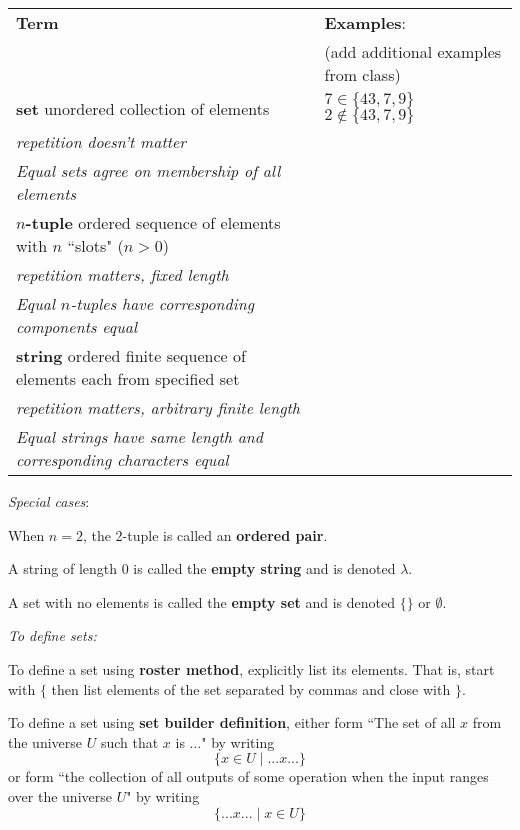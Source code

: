 \documentclass[12pt, oneside]{article}
\begin{document}
\begin{center}
    \begin{tabular}{p{4.6in}p{2.6in}}
    {\bf  Term} & {\bf Examples}:\\
    &  (add additional examples from class)\\
    \hline 
    {\bf set} \newline
    unordered collection of elements & $7 \in \{43, 7, 9 \}$ \qquad $2 \notin \{43, 7, 9 \}$ \\
    {\it repetition doesn't matter} & \\
    {\it Equal sets agree on membership of all elements}& \\
    \hline
    {\bf $n$-tuple} \newline
    ordered sequence of elements with $n$ ``slots" ($n >0$) & \\
    {\it repetition matters, fixed length} &\\
    {\it Equal $n$-tuples have corresponding components equal}& \\
    \hline
    {\bf string} \newline
    ordered finite sequence of elements each from specified
    set & \\
    {\it repetition matters, arbitrary finite length} &\\
    {\it Equal strings have same length and corresponding characters equal}
    \end{tabular}
\end{center}

{\it Special cases}: 

When $n=2$, the 2-tuple is called an {\bf ordered pair}.

A string of length $0$ is called the {\bf empty string} and is denoted $\lambda$.

A set with no elements is called the {\bf empty set} and is denoted $\{\}$ or $\emptyset$. 

{\it To define sets:}

To define a set using {\bf roster method}, explicitly list its elements. That is,
start with $\{$ then list elements of 
the set separated by commas and close with $\}$.

To define a set using {\bf set builder definition}, either form 
``The set of all $x$ from the universe $U$ such that $x$ is ..." by writing
\[\{x \in U \mid ...x... \}\]
or form ``the collection of all outputs of some operation when the input ranges over the universe $U$"
by writing
\[\{ ...x... \mid x\in U \}\]
\end{document}
